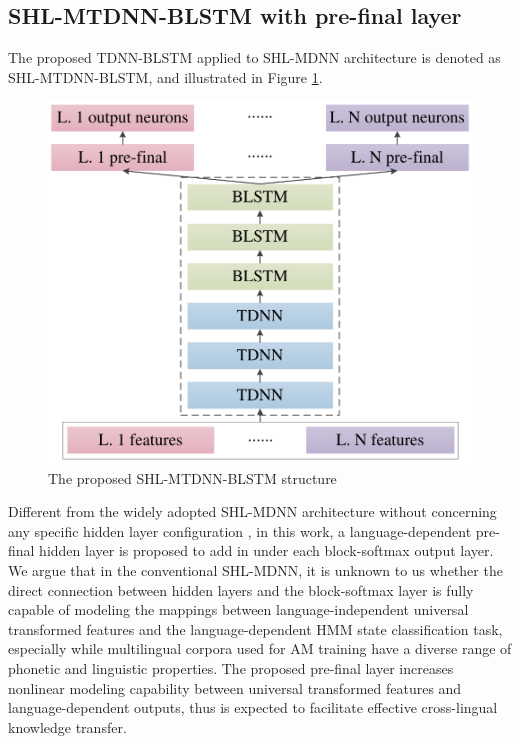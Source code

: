 \documentclass[a4paper]{article}
\begin{document}
\subsection{SHL-MTDNN-BLSTM with pre-final layer}
\label{sec:prefinal}
The proposed TDNN-BLSTM applied to SHL-MDNN architecture is denoted as SHL-MTDNN-BLSTM, and illustrated in
Figure \ref{fig:SHL-MTDNN-BLSTM}.
\begin{figure}[tbp]
\centering
\includegraphics[width= 0.75\linewidth]{SHL_TDNN_BLSTM_PF_font_tnr_emb.pdf}
\caption{The proposed SHL-MTDNN-BLSTM structure}
\label{fig:SHL-MTDNN-BLSTM}
\end{figure}
Different from the widely adopted SHL-MDNN architecture without concerning  any specific hidden layer configuration \cite{Huang2013cross,Zhou2017,karafiat20172016}, in this work,
a language-dependent pre-final hidden layer is proposed to add in under each block-softmax output layer.
We argue that in the conventional SHL-MDNN,  it is unknown to us whether the direct connection between hidden layers and the block-softmax layer is fully capable of modeling the mappings between language-independent universal transformed features and the language-dependent HMM state classification task,
especially while multilingual corpora used for AM training have a diverse range of phonetic and linguistic properties.
The proposed pre-final layer increases nonlinear modeling capability between universal transformed features and language-dependent outputs, thus is expected to facilitate effective cross-lingual knowledge transfer.
\end{document}
